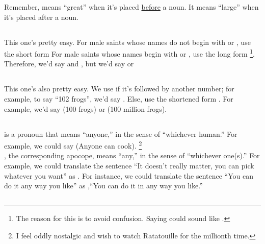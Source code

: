 Remember,  means ``great'' when it's placed \underline{before} a noun. It means ``large'' when it's placed after a noun.


\subsection{}

This one's pretty easy. For male saints whose names do not begin with  or , use the short form  For male saints whose names begin with  or , use the long form  \footnote{The reason for this is to avoid confusion. Saying \sout{} could sound like \sout{}.}. \\

Therefore, we'd say  and , but we'd say  or 

\subsection{}
This one's also pretty easy. We use  if it's followed by another number; for example, to say ``102 frogs'', we'd say . Else, use the shortened form . For example, we'd say  (100 frogs) or  (100 million frogs). 

\subsection{}

 is a pronoun that means ``anyone,'' in the sense of ``whichever human.'' For example, we could say  (Anyone can cook). \footnote{I feel oddly nostalgic and wish to watch Ratatouille for the millionth time.}  \\

, the corresponding apocope, means ``any,'' in the sense of ``whichever one(s).'' For example, we could translate the sentence ``It doesn't really matter, you can pick whatever you want'' as . For instance, we could translate the sentence ``You can do it any way you like'' as ,``You can do it in any way you like.''

\subsection{}

